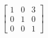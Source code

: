 \documentclass[preview]{standalone}
\begin{document}
\begin{align*}
\begin{bmatrix} 1 & 0 & 3 \\ 0 & 1 & 0 \\ 0 & 0 & 1 \end{bmatrix}
\end{align*}
\end{document}
